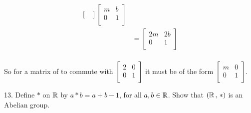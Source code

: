 \begin{mdframed}[style=darkAnswer,frametitle={Joe Starr}]
\begin{multicols}{2}
\begin{align*}
\begin{bmatrix}
      \end{bmatrix} \begin{bmatrix}
      m              & b                  \\
      0              & 1                  \\
      \end{bmatrix} \\
                     & = \begin{bmatrix}  
      2m             & 2b                 \\
      0              & 1                  \\
      \end{bmatrix}                             \\
    \end{align*}
  \end{multicols}
  So for a matrix of to commute with $\begin{bmatrix}
  2 & 0 \\
  0 & 1 \\
  \end{bmatrix}$ it must be of the form $\begin{bmatrix}
  m & 0 \\
  0 & 1 \\
  \end{bmatrix}$.
\end{mdframed}
\newpage
\begin{mdframed}[style=darkQuesion]
  13. Define $\ast$ on $\mathbb{R}$ by $a\ast b = a+b-1$, for all $a,b\in \mathbb{R}$. Show that
  $\left(\mathbb{R}\,,\,\ast\right)$ is an Abelian group.
\end{mdframed}


